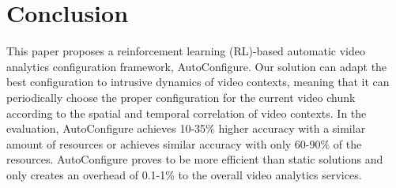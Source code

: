 \section{Conclusion}
\label{Section: conclusion}

This paper proposes a reinforcement learning (RL)-based automatic video analytics configuration framework, AutoConfigure. Our solution can adapt the best configuration to intrusive dynamics of video contexts, meaning that it can periodically choose the proper configuration for the current video chunk according to the spatial and temporal correlation of video contexts. In the evaluation, AutoConfigure achieves 10-35\% higher accuracy with a similar amount of resources or achieves similar accuracy with only 60-90\% of the resources. AutoConfigure proves to be more efficient than static solutions and only creates an overhead of 0.1-1\% to the overall video analytics services.